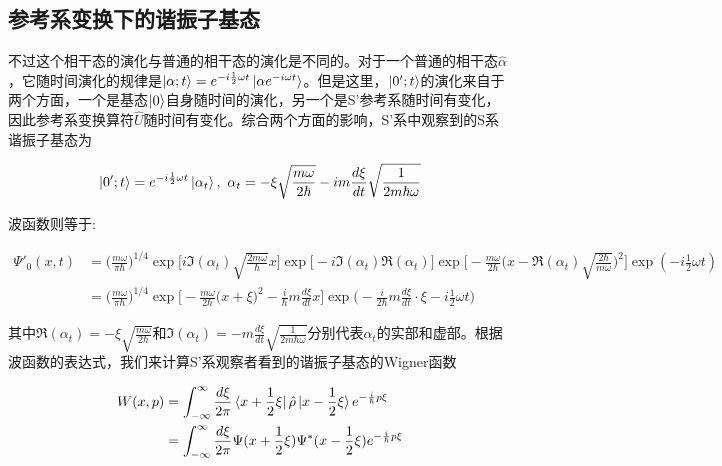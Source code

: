 \documentclass[a4paper]{article}
\begin{document}
    \subsection{参考系变换下的谐振子基态}

        不过这个相干态的演化与普通的相干态的演化是不同的。对于一个普通的相干态$\hat{\alpha}$，它随时间演化的规律是$\ket{\alpha;t}=e^{-i\frac{1}{2}\omega t}\ket{\alpha e^{-i\omega t}}$。但是这里，$\ket{0';t}$的演化来自于两个方面，一个是基态$\ket{0}$自身随时间的演化，另一个是S'参考系随时间有变化，因此参考系变换算符$\hat{U}$随时间有变化。综合两个方面的影响，S'系中观察到的S系谐振子基态为

        \begin{equation}
            \ket{0';t} = e^{-i\frac{1}{2}\omega t}\ket{\alpha_t}, \ \alpha_t=-\xi\sqrt{\frac{m\omega}{2\hbar}}-im\frac{d\xi}{dt}\sqrt{\frac{1}{2m\hbar\omega}}
        \end{equation}

        波函数则等于:

        \begin{equation}
            \begin{split}   
                \Psi'_0(x,t) &= \bigg(\frac{m\omega}{\pi\hbar}\bigg)^{1/4} \exp\biggl[i\Im(\alpha_t)\sqrt{\frac{2m\omega}{\hbar}}x\biggr] \exp\biggl[-i\Im(\alpha_t)\Re(\alpha_t)\biggr] \exp\biggl[-\frac{m\omega}{2\hbar} \bigl(x-\Re(\alpha_t)\sqrt{\frac{2\hbar}{m\omega}}\bigr)^2 \biggr] \exp(-i\frac{1}{2}\omega t) \\
                    &= \bigg(\frac{m\omega}{\pi\hbar}\bigg)^{1/4} \exp\biggl[-\frac{m\omega}{2\hbar} \bigl(x+\xi\bigr)^2-\frac{i}{\hbar}m\frac{d\xi}{dt}x\biggr] \exp\biggl(-\frac{i}{2\hbar}m\frac{d\xi}{dt}\cdot\xi-i\frac{1}{2}\omega t \biggr)
            \end{split}
        \end{equation}

        其中$\Re(\alpha_t)=-\xi\sqrt{\frac{m\omega}{2\hbar}}$和$\Im(\alpha_t)=-m\frac{d\xi}{dt}\sqrt{\frac{1}{2m\hbar\omega}}$分别代表$\alpha_t$的实部和虚部。根据波函数的表达式，我们来计算S'系观察者看到的谐振子基态的Wigner函数

        \begin{equation}
            \begin{split}
                W(x, p) &= \int_{-\infty}^\infty \frac{d\xi}{2\pi}\bra{x+\frac{1}{2}\xi}\hat{\rho}\ket{x-\frac{1}{2}\xi} e^{-\frac{i}{\hbar}p\xi} \\
                    &= \int_{-\infty}^\infty\frac{d\xi}{2\pi} \Psi(x+\frac{1}{2}\xi)\Psi^*(x-\frac{1}{2}\xi) e^{-\frac{i}{\hbar}p\xi}
            \end{split}
        \end{equation}
\end{document}
